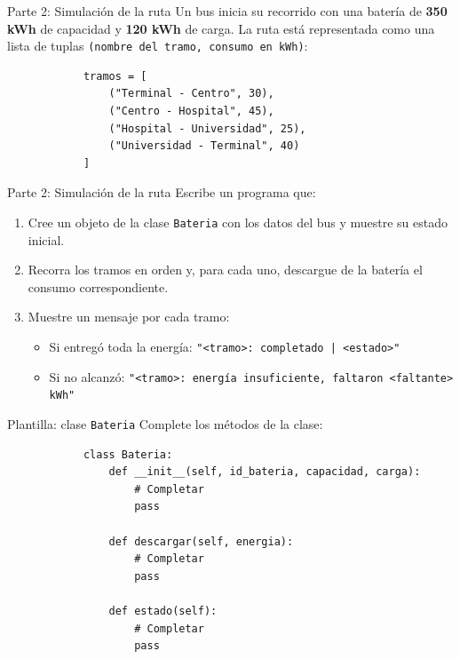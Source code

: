 \documentclass{beamer}
\begin{document}
    \begin{frame}[fragile, t]{Parte 2: Simulación de la ruta}
        Un bus inicia su recorrido con una batería de \textbf{350 kWh} de capacidad
        y \textbf{120 kWh} de carga. La ruta está representada como una lista de tuplas
        \texttt{(nombre del tramo, consumo en kWh)}:
        \begin{verbatim}
            tramos = [
                ("Terminal - Centro", 30),
                ("Centro - Hospital", 45),
                ("Hospital - Universidad", 25),
                ("Universidad - Terminal", 40)
            ]
        \end{verbatim}
    \end{frame}

    \begin{frame}[fragile, t]{Parte 2: Simulación de la ruta}
        Escribe un programa que:
        \begin{enumerate}
            \item Cree un objeto de la clase \texttt{Bateria} con los datos
            del bus y muestre su estado inicial.
            \pause
            \item Recorra los tramos en orden y, para cada uno, descargue de la batería
            el consumo correspondiente.
            \pause
            \item Muestre un mensaje por cada tramo:
            \begin{itemize}
                \item Si entregó toda la energía:
                \texttt{"<tramo>: completado | <estado>"}
                \item Si no alcanzó:
                \texttt{"<tramo>: energía insuficiente, faltaron <faltante> kWh"}
            \end{itemize}
        \end{enumerate}

        \vspace{0.5em}
    \end{frame}

    \begin{frame}[fragile, t]{Plantilla: clase \texttt{Bateria}}
        Complete los métodos de la clase:
        \begin{verbatim}
            class Bateria:
                def __init__(self, id_bateria, capacidad, carga):
                    # Completar
                    pass

                def descargar(self, energia):
                    # Completar
                    pass

                def estado(self):
                    # Completar
                    pass
        \end{verbatim}
    \end{frame}
\end{document}
